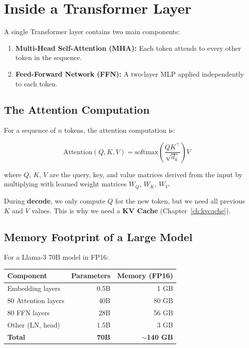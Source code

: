 \documentclass[11pt, twoside, openright]{book}
\begin{document}
\section{Inside a Transformer Layer}

A single Transformer layer contains two main components:

\begin{enumerate}
  \item \textbf{Multi-Head Self-Attention (MHA):} Each token attends to every
        other token in the sequence.
  \item \textbf{Feed-Forward Network (FFN):} A two-layer MLP applied independently
        to each token.
\end{enumerate}

\subsection{The Attention Computation}

For a sequence of $n$ tokens, the attention computation is:

\[
  \text{Attention}(Q, K, V) = \text{softmax}\!\left(\frac{QK^\top}{\sqrt{d_k}}\right) V
\]

where $Q$, $K$, $V$ are the query, key, and value matrices derived from the input
by multiplying with learned weight matrices $W_Q$, $W_K$, $W_V$.

During \textbf{decode}, we only compute $Q$ for the new token, but we need all
previous $K$ and $V$ values.  This is why we need a \textbf{KV Cache}
(Chapter~\ref{ch:kvcache}).

\subsection{Memory Footprint of a Large Model}

For a Llama-3 70B model in FP16:

\begin{center}
\begin{tabular}{lrr}
  \toprule
  \textbf{Component} & \textbf{Parameters} & \textbf{Memory (FP16)} \\
  \midrule
  Embedding layers & 0.5B & 1 GB \\
  80 Attention layers & 40B & 80 GB \\
  80 FFN layers & 28B & 56 GB \\
  Other (LN, head) & 1.5B & 3 GB \\
  \midrule
  \textbf{Total} & \textbf{70B} & \textbf{$\sim$140 GB} \\
  \bottomrule
\end{tabular}
\end{center}
\end{document}

